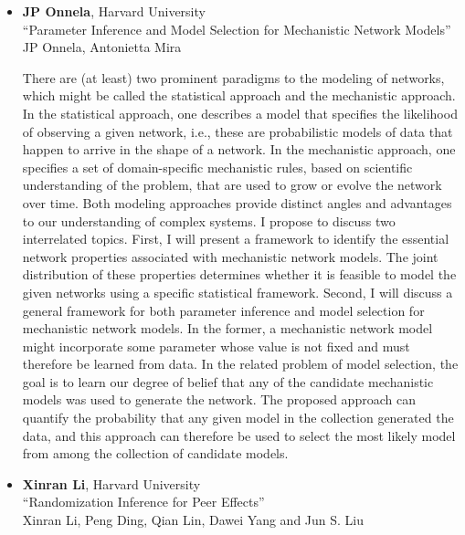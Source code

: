 \begin{itemize}
\item \textbf{JP Onnela}, Harvard University \\
``Parameter Inference and Model Selection for Mechanistic Network Models'' \\
JP Onnela, Antonietta Mira


There are (at least) two prominent paradigms to the modeling of networks, which might be called the statistical approach and the mechanistic approach. In the statistical approach, one describes a model that specifies the likelihood of observing a given network, i.e., these are probabilistic models of data that happen to arrive in the shape of a network. In the mechanistic approach, one specifies a set of domain-specific mechanistic rules, based on scientific understanding of the problem, that are used to grow or evolve the network over time. Both modeling approaches provide distinct angles and advantages to our understanding of complex systems. I propose to discuss two interrelated topics. First, I will present a framework to identify the essential network properties associated with mechanistic network models. The joint distribution of these properties determines whether it is feasible to model the given networks using a specific statistical framework. Second, I will discuss a general framework for both parameter inference and model selection for mechanistic network models. In the former, a mechanistic network model might incorporate some parameter whose value is not fixed and must therefore be learned from data. In the related problem of model selection, the goal is to learn our degree of belief that any of the candidate mechanistic models was used to generate the network. The proposed approach can quantify the probability that any given model in the collection generated the data, and this approach can therefore be used to select the most likely model from among the collection of candidate models.

\item \textbf{Xinran Li}, Harvard University \\
``Randomization Inference for Peer Effects'' \\
Xinran Li, Peng Ding, Qian Lin, Dawei Yang and Jun S. Liu



\end{itemize}
